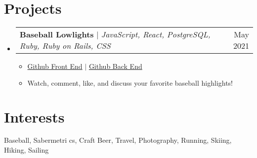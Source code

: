 \documentclass[letterpaper,11pt]{article}
\makeatletter
\newcommand{\resumeItem}[1]{
  \item\small{
    {#1 \vspace{-2pt}}
  }
}
\newcommand{\resumeProjectHeading}[2]{
    \item
    \begin{tabular*}{0.97\textwidth}{l@{\extracolsep{\fill}}r}
      \small#1 & #2 \\
    \end{tabular*}\vspace{-7pt}
}
\newcommand{\resumeSubHeadingListStart}{\begin{itemize}[leftmargin=0.15in, label={}]}
\newcommand{\resumeSubHeadingListEnd}{\end{itemize}}
\newcommand{\resumeItemListStart}{\begin{itemize}}
\newcommand{\resumeItemListEnd}{\end{itemize}\vspace{-5pt}}
\makeatother
\begin{document}
\section{Projects}
    \resumeSubHeadingListStart
      \resumeProjectHeading
          {\textbf{Baseball Lowlights} $|$ \emph{JavaScript, React, PostgreSQL, Ruby, Ruby on Rails, CSS}}{May 2021}
          \resumeItemListStart
            \resumeItem{\href{https://github.com/coltenappleby/Baseball-Lowlights-FE}{Github Front End} $|$  \href{https://github.com/coltenappleby/Baseball-Lowlights-BE}{Github Back End}}
            \resumeItem{Watch, comment, like, and discuss your favorite baseball highlights!}
          \resumeItemListEnd
    \resumeSubHeadingListEnd

\section{Interests}
\begin{itemize}[leftmargin=0.15in, label={}]
   \small{\item{
    {Baseball, Sabermetri cs, Craft Beer, Travel, Photography, Running, Skiing, Hiking, Sailing} \\
   }}
\end{itemize}


\end{document}
